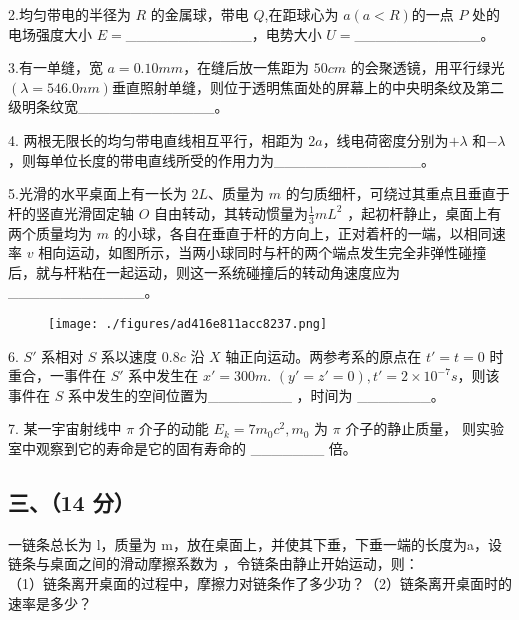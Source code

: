 2.均匀带电的半径为 $R$ 的金属球，带电 $Q$,在距球心为 $a(a<R)$的一点 $P$ 处的电场强度大小 $E=$____________，电势大小 $U=$____________。

3.有一单缝，宽 $a=0.10mm$，在缝后放一焦距为 $50cm$ 的会聚透镜，用平行绿光$(\lambda=546.0nm)$垂直照射单缝，则位于透明焦面处的屏幕上的中央明条纹及第二级明条纹宽_____________。

4. 两根无限长的均匀带电直线相互平行，相距为 $2a$，线电荷密度分别为$+\lambda$ 和$-\lambda$ ，则每单位长度的带电直线所受的作用力为______________。

5.光滑的水平桌面上有一长为 $2L$、质量为 $m$ 的匀质细杆，可绕过其重点且垂直于杆的竖直光滑固定轴 $O$ 自由转动，其转动惯量为$\frac{1}{3}mL^2$ ，起初杆静止，桌面上有两个质量均为 $m$ 的小球，各自在垂直于杆的方向上，正对着杆的一端，以相同速率 $v$ 相向运动，如图所示，当两小球同时与杆的两个端点发生完全非弹性碰撞后，就与杆粘在一起运动，则这一系统碰撞后的转动角速度应为 _____________。
\begin{figure}[ht]
\centering
\texttt{[image: ./figures/ad416e811acc8237.png]}
\caption{} \label{fig_NJUD5_3}
\end{figure}
6. $S'$ 系相对 $S$ 系以速度 $0.8c$ 沿 $X$ 轴正向运动。两参考系的原点在 $t'=t=0$ 时重合，一事件在 $S'$ 系中发生在 $x'=300 m$. $(y'=z'=0), t'=2\times10^{-7} s$，则该事件在 $S$ 系中发生的空间位置为________ ，时间为 _______。

7. 某一宇宙射线中 $\pi$ 介子的动能 $E_k = 7 m_0 c^2,m_0$ 为 $\pi$ 介子的静止质量，  则实验室中观察到它的寿命是它的固有寿命的 _______ 倍。
\subsection{三、（14 分）}
一链条总长为 l，质量为 m，放在桌面上，并使其下垂，下垂一端的长度为a，设链条与桌面之间的滑动摩擦系数为 ，令链条由静止开始运动，则：\\
（1）链条离开桌面的过程中，摩擦力对链条作了多少功？（2）链条离开桌面时的速率是多少？
